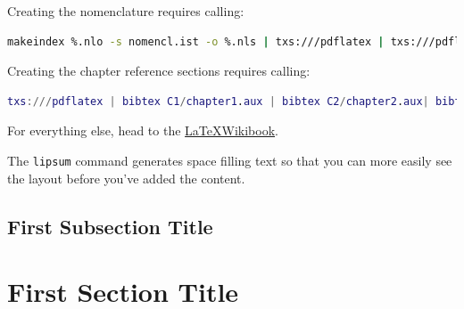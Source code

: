 Creating the nomenclature requires calling:

\begin{singlespacing}
\begin{lstlisting}[backgroundcolor = \color{lightgray},
                   language = sh,
                   xleftmargin = 2cm,
                   xrightmargin = 2cm,
                   framexleftmargin = 1em]
makeindex %.nlo -s nomencl.ist -o %.nls | txs:///pdflatex | txs:///pdflatex
\end{lstlisting}
\end{singlespacing}

Creating the chapter reference sections requires calling:

\begin{singlespacing}
\begin{lstlisting}[backgroundcolor = \color{lightgray},
                   language = MatLab,
                   xleftmargin = 2cm,
                   xrightmargin = 2cm,
                   framexleftmargin = 1em]
txs:///pdflatex | bibtex C1/chapter1.aux | bibtex C2/chapter2.aux| bibtex C3/chapter3.aux| bibtex C4/chapter4.aux| bibtex C5/chapter5.aux | bibtex C6/chapter6.aux | bibtex CA1/chapterA1.aux | txs:///pdflatex | txs:///pdflatex
\end{lstlisting}
\end{singlespacing}

For everything else, head to the \href{https://en.wikibooks.org/wiki/LaTeX}{\LaTeX Wikibook}.

The \texttt{lipsum} command generates space filling text so that you can more easily see the layout before you've added the content.


\lipsum

\subsection{First Subsection Title}

\lipsum[3]

\section{First Section Title}

\lipsum[4-5]

\pagebreak
\renewcommand\bibname{{References}}


